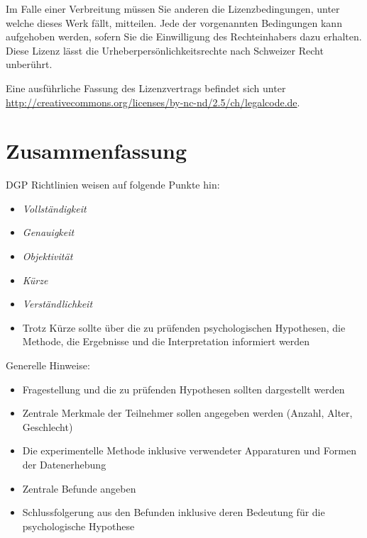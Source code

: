 \documentclass[11pt, twoside, a4paper]{book}		%
\begin{document}
\begin{titlepage}
	\RaggedRight Im Falle einer Verbreitung müssen Sie anderen die Lizenzbedingungen, unter welche dieses Werk fällt, mitteilen. Jede der vorgenannten Bedingungen kann aufgehoben werden, sofern Sie die Einwilligung des Rechteinhabers dazu erhalten. Diese Lizenz lässt die Urheberpersönlichkeitsrechte nach Schweizer Recht unberührt. 
	
	\hspace{1cm}
	
	Eine ausführliche Fassung des Lizenzvertrags befindet sich unter \url{http://creativecommons.org/licenses/by-nc-nd/2.5/ch/legalcode.de}.

\end{titlepage}
\restoregeometry


\chapter*{Zusammenfassung \label{cha:Zusammenfassung}}
\noindent
DGP Richtlinien weisen auf folgende Punkte hin:
\begin{itemize}
	\item \textit{Vollständigkeit}
	\item \textit{Genauigkeit}
	\item \textit{Objektivität}
	\item \textit{Kürze}
	\item \textit{Verständlichkeit}
	\item Trotz Kürze sollte über die zu prüfenden psychologischen Hypothesen, die Methode, die Ergebnisse
		  und die Interpretation informiert werden
\end{itemize}

\noindent Generelle Hinweise:
\begin{itemize}
	\item Fragestellung und die zu prüfenden Hypothesen sollten dargestellt werden
	\item Zentrale Merkmale der Teilnehmer sollen angegeben werden (Anzahl, Alter, Geschlecht)
	\item Die experimentelle Methode inklusive verwendeter Apparaturen und Formen der Datenerhebung
	\item Zentrale Befunde angeben
	\item Schlussfolgerung aus den Befunden inklusive deren Bedeutung für die psychologische Hypothese
\end{itemize}
\pagebreak
\end{document}
